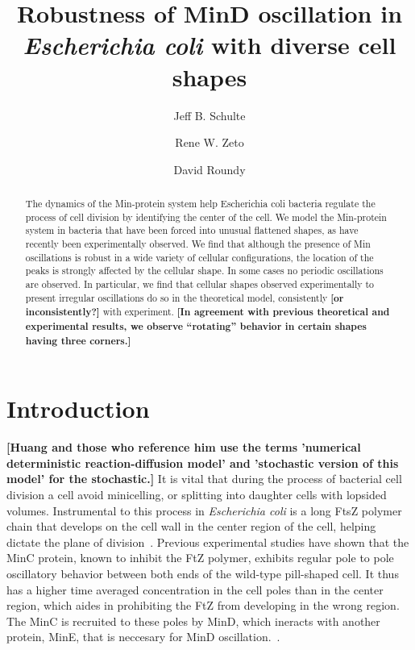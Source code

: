 \documentclass[letterpaper,twocolumn,amsmath,amssymb,pre]{revtex4-1}
\newcommand{\red}[1]{{\bf \color{red} #1}}
\newcommand{\fixme}[1]{\red{[#1]}}
\begin{document}
\title{Robustness of MinD oscillation in \emph{Escherichia coli} with
  diverse cell shapes}

\author{Jeff B. Schulte}
\author{Rene W. Zeto}
\author{David Roundy}

\begin{abstract}
  The dynamics of the Min-protein system help Escherichia coli
  bacteria regulate the process of cell division by identifying the
  center of the cell.  We model the Min-protein system in bacteria
  that have been forced into unusual flattened shapes, as have
  recently been experimentally observed.  We find that although the
  presence of Min oscillations is robust in a wide variety of cellular
  configurations, the location of the peaks is strongly affected by
  the cellular shape.  In some cases no periodic oscillations are
  observed.  In particular, we find that cellular shapes observed
  experimentally to present irregular oscillations do so in the
  theoretical model, consistently \fixme{or inconsistently?} with
  experiment.  \fixme{In agreement with previous theoretical and
    experimental results, we observe ``rotating'' behavior in certain
    shapes having three corners.}
\end{abstract}

\maketitle

\section{Introduction}
\fixme{Huang and those who reference him use the terms 'numerical
  deterministic reaction-diffusion model' and 'stochastic version of
  this model' for the stochastic.} It is vital that during the process
of bacterial cell division a cell avoid minicelling, or splitting into
daughter cells with lopsided volumes.  Instrumental to this process in
\emph{Escherichia coli} is a long FtsZ polymer chain that develops on
the cell wall in the center region of the cell, helping dictate the
plane of
division~\cite{adams2009bacterial,lutkenhaus2007assembly}. Previous
experimental studies have shown that the MinC protein, known to
inhibit the FtZ polymer\cite{shen2010examination}, exhibits regular
pole to pole oscillatory behavior between both ends of the wild-type
pill-shaped cell.  It thus has a higher time averaged concentration in
the cell poles than in the center region, which aides in prohibiting
the FtZ from developing in the wrong region.  The MinC is recruited to
these poles by MinD, which ineracts with another protein, MinE, that
is neccesary for MinD oscillation.~\cite{hu1999topological,
  fu2001mine, shapiro2009and, yu1999ftsz, raskin1999rapid}.
\end{document}
